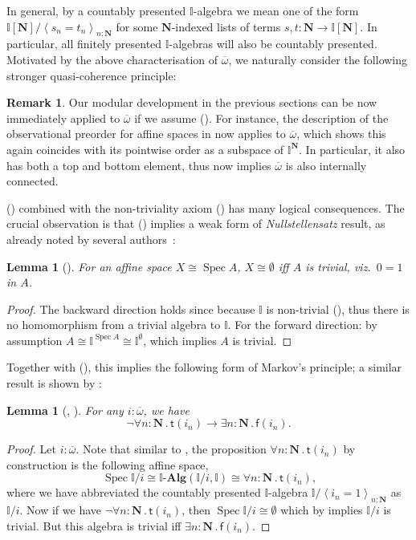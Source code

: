\documentclass[a4paper,12pt]{amsart}
\newtheorem{lemma}[theorem]{Lemma}
\theoremstyle{definition}
\newtheorem{remark}[theorem]{Remark}
\newcommand{\mb}[1]{\mathbf{#1}}
\newcommand{\mbb}[1]{\mathbb{#1}}
\newcommand{\I}{\mbb I}
\newcommand{\ms}[1]{\mathsf{#1}}
\newcommand{\alg}{\text{-}\mb{Alg}}
\newcommand{\ov}[1]{\overline{#1}}
\newcommand{\pair}[1]{\left\langle#1\right\rangle}
\newcommand{\N}{\mb N}
\newcommand{\fa}[2]{\forall #1\!\colon\!\!#2\mathpunct{.}}
\newcommand{\ex}[2]{\exists #1\!\colon\!\!#2\mathpunct{.}}
\newcommand{\emp}{\emptyset}
\newcommand{\spec}{\operatorname{Spec}}
\newcommand\istsym{\ms{t}}
\newcommand\isfsym{\ms{f}}
\newcommand\ist[1]{\istsym(#1)}
\newcommand\isf[1]{\isfsym(#1)}
\begin{document}
In general, by a countably presented $\I$-algebra we mean one of the form $\I[\N]/\pair{s_n = t_n}_{n:\N}$ for some $\N$-indexed lists of terms $s,t \colon \N \to \I[\N]$. In particular, all finitely presented $\I$-algebras will also be countably presented. Motivated by the above characterisation of $\ov\omega$, we naturally consider the following stronger quasi-coherence principle:


\PrintAxiomSQCC

\begin{remark}
  Our modular development in the previous sections can be now immediately applied to $\ov\omega$ if we assume (\AxiomSQCC). For instance, the description of the observational preorder for affine spaces in  now applies to $\ov\omega$, which shows this again coincides with its pointwise order as a subspace of $\I^\N$. In particular, it also has both a top and bottom element, thus  now implies $\ov\omega$ is also internally connected. 
\end{remark}

(\AxiomSQCC) combined with the non-triviality axiom (\AxiomNT) has many logical consequences. The crucial observation is that (\AxiomNT) implies a weak form of \emph{Nullstellensatz} result, as already noted by several authors~\citep{blechschmidt2021using,blechschmidt2020general,Cherubini_Coquand_Hutzler_2024}:

\begin{lemma}[\AxiomNT]\label{lem:nulls}
  For an affine space $X \cong \spec A$, $X \cong \emp$ iff $A$ is trivial, viz.\ $0=1$ in $A$.
\end{lemma}
\begin{proof}
  The backward direction holds since because $\I$ is non-trivial (\AxiomNT), thus there is no homomorphism from a trivial algebra to $\I$. For the forward direction: by assumption $A \cong \I^{\spec A} \cong \I^\emp$, which implies $A$ is trivial. 
\end{proof}

Together with (\AxiomSQCC), this implies the following form of Markov's principle; a similar result is shown by \citet{cherubini2024foundation}:

\begin{lemma}[\AxiomNT, \AxiomSQCC]\label{lem:markov}
  For any $i : \ov\omega$, we have
  \[ \neg\fa{n}{\N}\ist{i_n} \to \ex n\N\isf{i_n}\text{.} \]
\end{lemma}
\begin{proof}
  Let $i : \ov\omega$. Note that similar to , the proposition $\fa n\N \ist{i_n}$ by construction is the following affine space, 
  \[ \spec\I/i \cong \I\alg(\I/i,\I) \cong \fa n\N \ist{i_n}\text{,} \]
  where we have abbreviated the countably presented $\I$-algebra $\I/\pair{i_n=1}_{n:\N}$ as $\I/i$. Now if we have $\neg\fa n\N \ist{i_n}$, then $\spec\I/i \cong \emp$ which by  implies $\I/i$ is trivial. But this algebra is trivial iff $\ex n\N \isf{i_n}$.
\end{proof}
\end{document}
